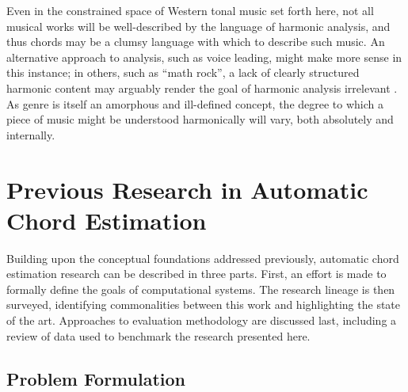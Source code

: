 Even in the constrained space of Western tonal music set forth here, not all musical works will be well-described by the language of harmonic analysis, and thus chords may be a clumsy language with which to describe such music.
An alternative approach to analysis, such as voice leading, might make more sense in this instance;
in others, such as ``math rock'', a lack of clearly structured harmonic content may arguably render the goal of harmonic analysis irrelevant \cite{Cateforis2002Alternative}.
As genre is itself an amorphous and ill-defined concept, the degree to which a piece of music might be understood harmonically will vary, both absolutely and internally.



\section{Previous Research in Automatic Chord Estimation}
\label{sec:background}

Building upon the conceptual foundations addressed previously, automatic chord estimation research can be described in three parts.
First, an effort is made to formally define the goals of computational systems.
The research lineage is then surveyed, identifying commonalities between this work and highlighting the state of the art.
Approaches to evaluation methodology are discussed last, including a review of data used to benchmark the research presented here.


\subsection{Problem Formulation}
\label{subsec:problem_formulation}


